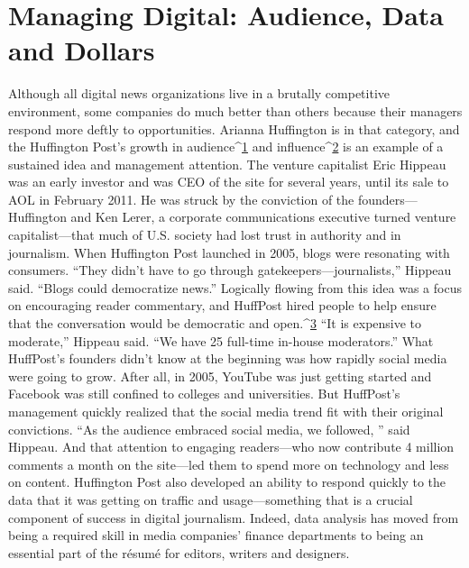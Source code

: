 \chapter{Managing Digital: Audience, Data and Dollars}
Although all digital news organizations live in a brutally competitive environment,
some companies do much better than others because their managers
respond more deftly to opportunities.
Arianna Huffington is in that category, and the Huffington Post’s growth in
audience^{\href{#endnotes-ch9}{1}} and influence^{\href{#endnotes-ch9}{2}} is an example of a sustained idea and management attention.
The venture capitalist Eric Hippeau was an early investor and was CEO
of the site for several years, until its sale to AOL in February 2011. He was struck
by the conviction of the founders—Huffington and Ken Lerer, a corporate communications
executive turned venture capitalist—that much of U.S. society had
lost trust in authority and in journalism. When Huffington Post launched in
2005, blogs were resonating with consumers. ``They didn’t have to go through
gatekeepers—journalists,'' Hippeau said. ``Blogs could democratize news.'' Logically
flowing from this idea was a focus on encouraging reader commentary, and
HuffPost hired people to help ensure that the conversation would be democratic
and open.^{\href{#endnotes-ch9}{3}} ``It is expensive to moderate,'' Hippeau said. ``We have 25 full-time
in-house moderators.''
What HuffPost’s founders didn’t know at the beginning was how rapidly social
media were going to grow. After all, in 2005, YouTube was just getting started and
Facebook was still confined to colleges and universities. But HuffPost’s management
quickly realized that the social media trend fit with their original convictions.
``As the audience embraced social media, we followed, '' said Hippeau. And
that attention to engaging readers—who now contribute 4 million comments a
month on the site—led them to spend more on technology and less on content.
Huffington Post also developed an ability to respond quickly to the data that it
was getting on traffic and usage—something that is a crucial component of success
in digital journalism. Indeed, data analysis has moved from being a required
skill in media companies’ finance departments to being an essential part of the
résumé for editors, writers and designers.


